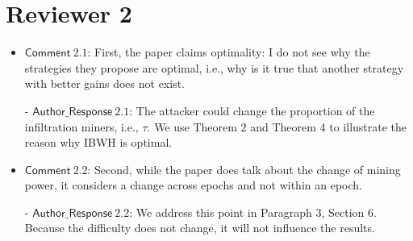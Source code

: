 \documentclass[]{article}
\newcommand{\AR}[1]{\mathsf{Author\_Response}\ #1}
\newcommand{\CM}[1]{{\mathsf{Comment}\ #1}}
\begin{document}
\section{Reviewer 2}




\begin{itemize}
\item $\CM{2.1}$: First, the paper claims optimality: I do not see why the strategies they propose are optimal, i.e., why is it true that another strategy with better gains does not exist.
\item[-] $\AR{2.1}$: The attacker could change the proportion of the infiltration miners, i.e., $\tau.$ We use Theorem 2 and Theorem 4 to illustrate the reason why IBWH is optimal.
	

\item $\CM{2.2}$: Second, while the paper does talk about the change of mining power, it considers a change across epochs and not within an epoch. 

\item[-] $\AR{2.2}$:  We address this point in Paragraph 3, Section 6. Because the difficulty does not change, it will not influence the results. 

\end{itemize}






\end{document}
